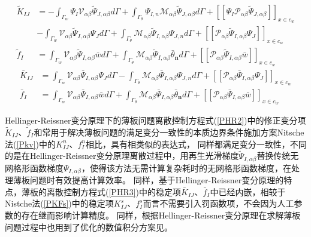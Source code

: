 \begin{subequations}\label{PHR2}
\begin{align}
  \tilde{K}_{IJ}&=-\int_{\Gamma_w}\Psi_I\mathcal{V}_{\alpha\beta}\tilde{\Psi}_{J,\alpha\beta}d\Gamma+\int_{\Gamma_{\theta}}\Psi_{I,n}\mathcal{M}_{\alpha\beta}\tilde{\Psi}_{J,\alpha\beta}d\Gamma+[[\Psi_I\mathcal{P}_{\alpha\beta}\tilde{\Psi}_{J,\alpha\beta}]]_{x\in{c_w}}\nonumber\\
    &-\int_{\Gamma_w}\mathcal{V}_{\alpha\beta}\tilde{\Psi}_{I,\alpha\beta}\Psi_Jd\Gamma+\int_{\Gamma_{\theta}}\mathcal{M}_{\alpha\beta}\tilde{\Psi}_{I,\alpha\beta}\Psi_{J,n}d\Gamma+[[\mathcal{P}_{\alpha\beta}\tilde{\Psi}_{I,\alpha\beta}\Psi_J]]_{x\in{c_w}} \\
    \tilde{f}_I&=\int_{\Gamma_w}\mathcal{V}_{\alpha\beta}\tilde{\Psi}_{I,\alpha\beta}\bar{w}d\Gamma+\int_{\Gamma_{\theta}}\mathcal{M}_{\alpha\beta}\tilde{\Psi}_{I,\alpha\beta}\bar{\theta}_{\pmb n}d\Gamma+[[\mathcal{P}_{\alpha\beta}\tilde{\Psi}_{I,\alpha\beta}\bar{w}]]_{x\in{c_w}}
\end{align}
\end{subequations}
\begin{subequations}\label{PHR3}
\begin{align}
    \bar{K}_{IJ}&=\int_{\Gamma_w}\mathcal{V}_{\alpha\beta}\bar{\Psi}_{I,\alpha\beta}\Psi_Jd\Gamma-\int_{\Gamma_{\theta}}\mathcal{M}_{\alpha\beta}\bar{\Psi}_{I,\alpha\beta}\Psi_{J,n}d\Gamma+[[\mathcal{P}_{\alpha\beta}\bar{\Psi}_{I,\alpha\beta}\Psi_J]]_{x\in{c_w}}\\
    \bar{f}_I&=\int_{\Gamma_w}\mathcal{V}_{\alpha\beta}\bar{\Psi}_{I,\alpha\beta}\bar{w}d\Gamma+\int_{\Gamma_{\theta}}\mathcal{M}_{\alpha\beta}\bar{\Psi}_{I,\alpha\beta}\bar{\theta}_{\pmb n}d\Gamma+[[\mathcal{P}_{\alpha\beta}\bar{\Psi}_{I,\alpha\beta}\bar{w}]]_{x\in{c_w}}
\end{align}
\end{subequations}
\par
Hellinger-Reissner变分原理下的薄板问题离散控制方程式(\ref{PHR2})中的修正变分项$\tilde{K}_{IJ}$、$\tilde{f}_I$和常用于解决薄板问题的满足变分一致性的本质边界条件施加方案Nitsche法(\ref{Pkv})中的$K_{IJ}^n$、$f_I^n$相比，具有相类似的表达式，
同样都满足变分一致性，不同的是在Hellinger-Reissner变分原理离散过程中，用再生光滑梯度$\tilde{\Psi}_{I,\alpha\beta}$替换传统无网格形函数梯度$\Psi_{I,\alpha\beta}$，使得该方法无需计算复杂耗时的无网格形函数梯度，在处理薄板问题时有效提高计算效率。
同样，基于Hellinger-Reissner变分原理的特点，薄板的离散控制方程式(\ref{PHR3})中的稳定项$\bar{K}_{IJ}$、$\bar{f}_I$中已经内嵌，相较于Nistche法(\ref{PKFs})中的稳定项$K^s_{IJ}$、$f^s_I$而言不需要引入罚函数项，不会因为人工参数的存在继而影响计算精度。
同样，根据Hellinger-Reissner变分原理在求解薄板问题过程中也用到了优化的数值积分方案见。
